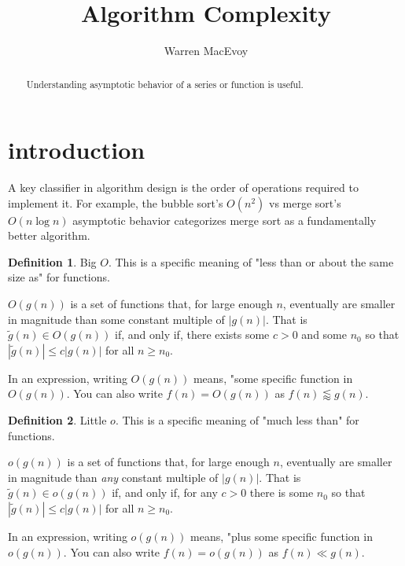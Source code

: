 \documentclass{tufte-handout}
\title{Algorithm Complexity}
\author[Warren MacEvoy]{Warren MacEvoy}
\theoremstyle{definition}
\newtheorem{definition}{Definition}
\theoremstyle{example}
\theoremstyle{theorem}
\begin{document}
\maketitle%

\begin{abstract}
\noindent Understanding asymptotic behavior of a series or function is useful.
\end{abstract}




\section{introduction}\label{sec:introduction}
A key classifier in algorithm design is the order of operations required to implement it.  For example, the bubble sort's $O(n^2)$ vs merge sort's $O(n \log n)$ asymptotic behavior categorizes merge sort as a fundamentally better algorithm.

\begin{definition}{Big $O$}.  This is a specific meaning of "less than or about the same size as" for functions.

$O(g(n))$ is a set of functions that, for large enough $n$, eventually are smaller in magnitude than some constant multiple of $|g(n)|$.  That is $\tilde{g}(n) \in O(g(n))$ if, and only if, there exists some $c>0$ and some $n_0$ so that $|\tilde{g}(n)| \leq c |g(n)|$ for all $n \geq n_0$.  
\end{definition}

In an expression, writing $O(g(n))$ means, "some specific function in $O(g(n))$.  You can also write $f(n)=O(g(n))$ as $f(n) \lessapprox g(n)$.



\begin{definition}{Little $o$}.  This is a specific meaning of "much less than" for functions.

$o(g(n))$ is a set of functions that, for large enough $n$, eventually are smaller in magnitude than {\em any}  constant multiple of $|g(n)|$.  That is $\tilde{g}(n) \in o(g(n))$ if, and only if, for any $c > 0$ there is some $n_0$ so that $|\tilde{g}(n)| \leq c |g(n)|$ for all $n \geq n_0$.  
\end{definition}

In an expression, writing $o(g(n))$ means, "plus some specific function in $o(g(n))$. You can also write $f(n)=o(g(n))$ as $f(n) \ll g(n)$.
\end{document}
